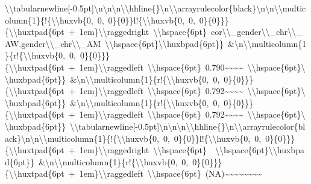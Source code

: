 \documentclass[
  english,
  man]{apa6}
\begin{document}
\textbackslash{}\textbackslash{}tabularnewline{[}-0.5pt{]}\textbackslash{}n\textbackslash{}n\textbackslash{}n\textbackslash{}\textbackslash{}hhline\{\}\textbackslash{}n\textbackslash{}\textbackslash{}arrayrulecolor\{black\}\textbackslash{}n\textbackslash{}n\textbackslash{}\textbackslash{}multicolumn\{1\}\{!\{\textbackslash{}\textbackslash{}huxvb\{0,\ 0,\ 0\}\{0\}\}l!\{\textbackslash{}\textbackslash{}huxvb\{0,\ 0,\ 0\}\{0\}\}\}\{\textbackslash{}\textbackslash{}huxtpad\{6pt\ +\ 1em\}\textbackslash{}\textbackslash{}raggedright\ \textbackslash{}\textbackslash{}hspace\{6pt\}\ cor\textbackslash{}\textbackslash{}\_gender\textbackslash{}\textbackslash{}\_chr\textbackslash{}\textbackslash{}\_AW.gender\textbackslash{}\textbackslash{}\_chr\textbackslash{}\textbackslash{}\_AM\ \textbackslash{}\textbackslash{}hspace\{6pt\}\textbackslash{}\textbackslash{}huxbpad\{6pt\}\}\ \&\textbackslash{}n\textbackslash{}\textbackslash{}multicolumn\{1\}\{r!\{\textbackslash{}\textbackslash{}huxvb\{0,\ 0,\ 0\}\{0\}\}\}\{\textbackslash{}\textbackslash{}huxtpad\{6pt\ +\ 1em\}\textbackslash{}\textbackslash{}raggedleft\ \textbackslash{}\textbackslash{}hspace\{6pt\}\ 0.790\textasciitilde{}\textasciitilde{}\textasciitilde{}\textasciitilde{}\ \textbackslash{}\textbackslash{}hspace\{6pt\}\textbackslash{}\textbackslash{}huxbpad\{6pt\}\}\ \&\textbackslash{}n\textbackslash{}\textbackslash{}multicolumn\{1\}\{r!\{\textbackslash{}\textbackslash{}huxvb\{0,\ 0,\ 0\}\{0\}\}\}\{\textbackslash{}\textbackslash{}huxtpad\{6pt\ +\ 1em\}\textbackslash{}\textbackslash{}raggedleft\ \textbackslash{}\textbackslash{}hspace\{6pt\}\ 0.792\textasciitilde{}\textasciitilde{}\textasciitilde{}\textasciitilde{}\ \textbackslash{}\textbackslash{}hspace\{6pt\}\textbackslash{}\textbackslash{}huxbpad\{6pt\}\}\ \&\textbackslash{}n\textbackslash{}\textbackslash{}multicolumn\{1\}\{r!\{\textbackslash{}\textbackslash{}huxvb\{0,\ 0,\ 0\}\{0\}\}\}\{\textbackslash{}\textbackslash{}huxtpad\{6pt\ +\ 1em\}\textbackslash{}\textbackslash{}raggedleft\ \textbackslash{}\textbackslash{}hspace\{6pt\}\ 0.792\textasciitilde{}\textasciitilde{}\textasciitilde{}\textasciitilde{}\ \textbackslash{}\textbackslash{}hspace\{6pt\}\textbackslash{}\textbackslash{}huxbpad\{6pt\}\}\ \textbackslash{}\textbackslash{}tabularnewline{[}-0.5pt{]}\textbackslash{}n\textbackslash{}n\textbackslash{}n\textbackslash{}\textbackslash{}hhline\{\}\textbackslash{}n\textbackslash{}\textbackslash{}arrayrulecolor\{black\}\textbackslash{}n\textbackslash{}n\textbackslash{}\textbackslash{}multicolumn\{1\}\{!\{\textbackslash{}\textbackslash{}huxvb\{0,\ 0,\ 0\}\{0\}\}l!\{\textbackslash{}\textbackslash{}huxvb\{0,\ 0,\ 0\}\{0\}\}\}\{\textbackslash{}\textbackslash{}huxtpad\{6pt\ +\ 1em\}\textbackslash{}\textbackslash{}raggedright\ \textbackslash{}\textbackslash{}hspace\{6pt\}\ \ \textbackslash{}\textbackslash{}hspace\{6pt\}\textbackslash{}\textbackslash{}huxbpad\{6pt\}\}\ \&\textbackslash{}n\textbackslash{}\textbackslash{}multicolumn\{1\}\{r!\{\textbackslash{}\textbackslash{}huxvb\{0,\ 0,\ 0\}\{0\}\}\}\{\textbackslash{}\textbackslash{}huxtpad\{6pt\ +\ 1em\}\textbackslash{}\textbackslash{}raggedleft\ \textbackslash{}\textbackslash{}hspace\{6pt\}\ (NA)\textasciitilde{}\textasciitilde{}\textasciitilde{}\textasciitilde{}\textasciitilde{}\textasciitilde{}\textasciitilde{}\textasciitilde{}\ 
\end{document}
